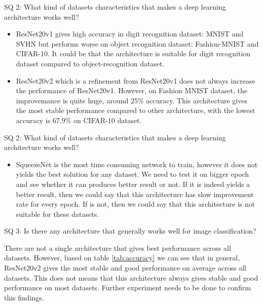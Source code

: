 \documentclass{beamer}
\begin{document}
\begin{frame}
SQ 2: What kind of datasets characteristics that makes a deep learning architecture works well?
\begin{itemize}
	\item ResNet20v1 gives high accuracy in digit recognition dataset: MNIST and SVHN but performs worse on object recognition dataset: Fashion-MNIST and CIFAR-10. It could be that the architecture is suitable for digit recognition dataset compared to object-recognition dataset.
	\item 	ResNet20v2 which is a refinement from ResNet20v1 does not always increase the performance of ResNet20v1. However, on Fashion MNIST dataset, the improvemance is quite huge, around 25\% accuracy. This architecture gives the most stable performance compared to other architecture, with the lowest accuracy is 67.9\% on CIFAR-10 dataset. 
\end{itemize}
\end{frame}
\begin{frame}
SQ 2: What kind of datasets characteristics that makes a deep learning architecture works well?
\begin{itemize}
	\item SqueezeNet is the most time consuming network to train, however it does not yields the best solution for any dataset. We need to test it on bigger epoch and see whether it can produces better result or not. If it is indeed yields a better result, then we could say that this architecture has slow improvement rate for every epoch. If is not, then we could say that this architecture is not suitable for these datasets. 
\end{itemize}
\end{frame}
\begin{frame}
SQ 3: Is there any architecture that generally works well for image classification?
	
	There are not a single architecture that gives best performance across all datasets. However, based on table \ref{tab:accuracy} we can see that in general, ResNet20v2 gives the most stable and good performance on average across all datasets. This does not means that this architecture always gives stable and good performance on most datasets. Further experiment needs to be done to confirm this findings.
\end{frame}

	
\end{document}
